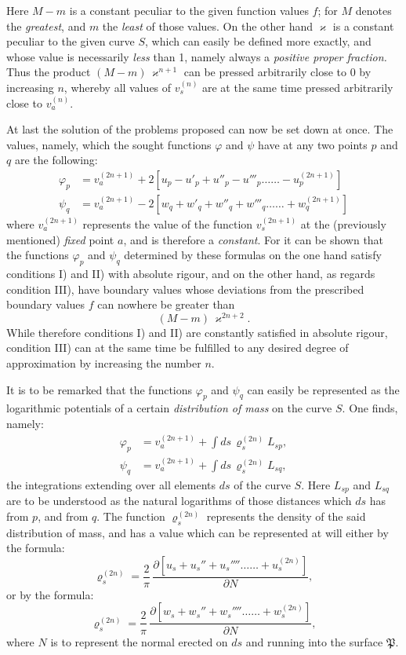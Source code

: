 \documentclass{article}
\begin{document}
Here $M-m$ is a constant peculiar to the given function values $f$; for $M$ denotes the \emph{greatest}, and $m$ the \emph{least} of those values. On the other hand $\varkappa$ is a constant peculiar to the given curve $S$, which can easily be defined more exactly, and whose value is necessarily \emph{less} than 1, namely always a \emph{positive proper fraction.} Thus the product $(M-m)\,\varkappa^{n+1}$ can be pressed arbitrarily close to 0 by increasing $n$, whereby all values of $v_{s}^{(n)}$ are at the same time pressed arbitrarily close to $v_{a}^{(n)}$.

At last the solution of the problems proposed can now be set down at once. The values, namely, which the sought functions $\varphi$ and $\psi$ have at any two points $p$ and $q$ are the following:
\[
\begin{aligned}
\varphi_{p} &= v_{a}^{(2n+1)}+2\left[u_{p}-u'_{p}+u''_{p}-u'''_{p}\ldots\ldots-u_{p}^{(2n+1)}\right]\\
\psi_{q} &= v_{a}^{(2n+1)}-2\left[w_{q}+w'_{q}+w''_{q}+w'''_{q}\ldots\ldots+w_{q}^{(2n+1)}\right]
\end{aligned}
\]
where $v_{a}^{(2n+1)}$ represents the value of the function $v_{s}^{(2n+1)}$ at the (previously mentioned) \emph{fixed} point $a$, and is therefore a \emph{constant}. For it can be shown that the functions $\varphi_{p}$ and $\psi_{q}$ determined by these formulas on the one hand satisfy conditions I) and II) with absolute rigour, and on the other hand, as regards condition III), have boundary values whose deviations from the prescribed boundary values $f$ can nowhere be greater than
\[
(M-m)\,\varkappa^{2n+2}.
\]
While therefore conditions I) and II) are constantly satisfied in absolute rigour, condition III) can at the same time be fulfilled to any desired degree of approximation by increasing the number $n$.

It is to be remarked that the functions $\varphi_{p}$ and $\psi_{q}$ can easily be represented as the logarithmic potentials of a certain \emph{distribution of mass} on the curve $S$. One finds, namely:
\[
\begin{aligned}
\varphi_{p} &= v_{a}^{(2n+1)}+\int ds\,\varrho_{s}^{(2n)}L_{sp},\\
\psi_{q} &= v_{a}^{(2n+1)}+\int ds\,\varrho_{s}^{(2n)}L_{sq},
\end{aligned}
\]
the integrations extending over all elements $ds$ of the curve $S$. Here $L_{sp}$ and $L_{sq}$ are to be understood as the natural logarithms of those distances which $ds$ has from $p$, and from $q$. The function $\varrho_{s}^{(2n)}$ represents the density of the said distribution of mass, and has a value which can be represented at will either by the formula:
\[
\varrho_{s}^{(2n)}=\frac{2}{\pi}\,\frac{\partial\left[u_{s}+u_{s}''+u_{s}''''\ldots\ldots+u_{s}^{(2n)}\right]}{\partial N},
\]
or by the formula:
\[
\varrho_{s}^{(2n)}=\frac{2}{\pi}\,\frac{\partial\left[w_{s}+w_{s}''+w_{s}''''\ldots\ldots+w_{s}^{(2n)}\right]}{\partial N},
\]
where $N$ is to represent the normal erected on $ds$ and running into the surface $\mathfrak{P}$.
\end{document}
